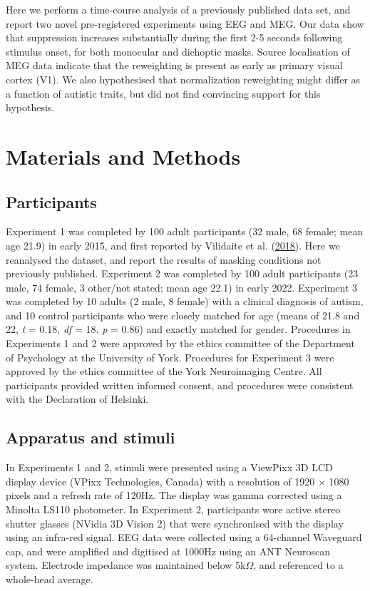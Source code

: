 \documentclass[
]{article}
\begin{document}
Here we perform a time-course analysis of a previously published data set, and report two novel pre-registered experiments using EEG and MEG. Our data show that suppression increases substantially during the first 2-5 seconds following stimulus onset, for both monocular and dichoptic masks. Source localisation of MEG data indicate that the reweighting is present as early as primary visual cortex (V1). We also hypothesised that normalization reweighting might differ as a function of autistic traits, but did not find convincing support for this hypothesis.

\hypertarget{materials-and-methods}{%
\section{Materials and Methods}\label{materials-and-methods}}

\hypertarget{participants}{%
\subsection{Participants}\label{participants}}

Experiment 1 was completed by 100 adult participants (32 male, 68 female; mean age 21.9) in early 2015, and first reported by Vilidaite et al. (\protect\hyperlink{ref-Vilidaite2018}{2018}). Here we reanalysed the dataset, and report the results of masking conditions not previously published. Experiment 2 was completed by 100 adult participants (23 male, 74 female, 3 other/not stated; mean age 22.1) in early 2022. Experiment 3 was completed by 10 adults (2 male, 8 female) with a clinical diagnosis of autism, and 10 control participants who were closely matched for age (means of 21.8 and 22, \emph{t} = 0.18, \emph{df} = 18, \emph{p} = 0.86) and exactly matched for gender. Procedures in Experiments 1 and 2 were approved by the ethics committee of the Department of Psychology at the University of York. Procedures for Experiment 3 were approved by the ethics committee of the York Neuroimaging Centre. All participants provided written informed consent, and procedures were consistent with the Declaration of Helsinki.

\hypertarget{apparatus-and-stimuli}{%
\subsection{Apparatus and stimuli}\label{apparatus-and-stimuli}}

In Experiments 1 and 2, stimuli were presented using a ViewPixx 3D LCD display device (VPixx Technologies, Canada) with a resolution of 1920 \(\times\) 1080 pixels and a refresh rate of 120Hz. The display was gamma corrected using a Minolta LS110 photometer. In Experiment 2, participants wore active stereo shutter glasses (NVidia 3D Vision 2) that were synchronised with the display using an infra-red signal. EEG data were collected using a 64-channel Waveguard cap, and were amplified and digitised at 1000Hz using an ANT Neuroscan system. Electrode impedance was maintained below 5k\(\Omega\), and referenced to a whole-head average.
\end{document}
